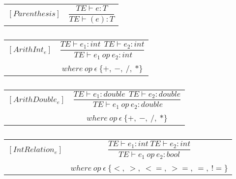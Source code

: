 \begin{table}[H]
    \begin{center}
    \begin{longtable}[c] { r c }
        $[Parenthesis] $
        & 
        \( \dfrac{T E  \vdash  e  :  T}{T E  \vdash  (e)  :  T} \)
    \end{longtable}
    \caption{}\label{type:expr}
        \end{center}
\end{table}
 
\begin{table}[H]
    \begin{center}
    \begin{longtable}[c] { r c }
        $[ArithInt_{e}]$ 
        & 
        \( \dfrac{TE \vdash e_{1} :  int \ \ TE \vdash e_{2} : int} 
        {\ TE \vdash e_{1} \ op \ e_{2} : int} \) 
        \\ \\
        & 
        \( {where \ op \ \epsilon \ \{+, \ -, \ /, \ *\} } \)
    \end{longtable}
    \caption{}\label{type:int-arith}
        \end{center}
\end{table}
\begin{table}[H]
    \begin{center}
    \begin{longtable}[c] { r c }
        $[ArithDouble_{e}]$ 
        & 
        \( \dfrac{TE \vdash e_{1} : double \ \ TE \vdash e_{2} :  double} 
        {\ TE \vdash e_{1} \ op \ e_{2} : double} \) 
        \\ \\
        & 
        \( {where \ op \ \epsilon \ \{+, \ -, \ /, \ *\} } \)
    \end{longtable}
    \caption{}\label{type:double-arith}
        \end{center}
\end{table}
\begin{table}[H]
    \begin{center}
    \begin{longtable}[c] { r c }
        $[IntRelation_{e}]$ 
        & 
        \( \dfrac{T E  \vdash  e_1  :  int \ T E  \vdash  e_2  :  int}{T E  \vdash  e_1 \ op \ e_2  :  bool} \) 
        \\ \\
        & 
        \( {where \ op \ \epsilon \ \{<,\ >,\ < =,\ >=,\ =,\ !=\}} \)
    \end{longtable}
    \caption{}\label{type:int-relation}
        \end{center}
\end{table}

